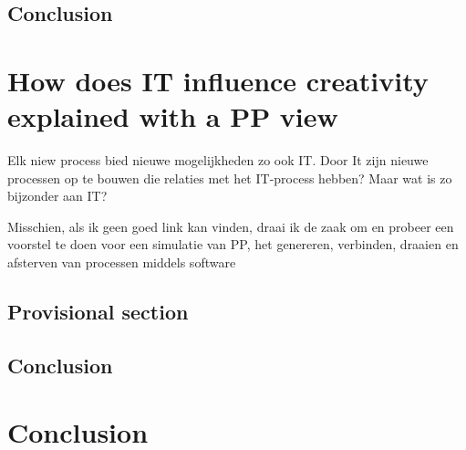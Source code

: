 \documentclass[a4paper]{Thesis}
\begin{document}
\section{Conclusion}

\chapter{How does IT influence creativity explained with a PP view}


Elk niew process bied nieuwe mogelijkheden zo ook IT. Door It zijn nieuwe processen op te bouwen die relaties met het IT-process hebben? Maar wat is zo bijzonder aan IT?

Misschien, als ik geen goed link kan vinden, draai ik de zaak om en probeer een voorstel te doen voor een simulatie van PP, het genereren, verbinden, draaien en afsterven van processen middels software

\section{Provisional section}

\section{Conclusion}

\chapter{Conclusion}
\end{document}
